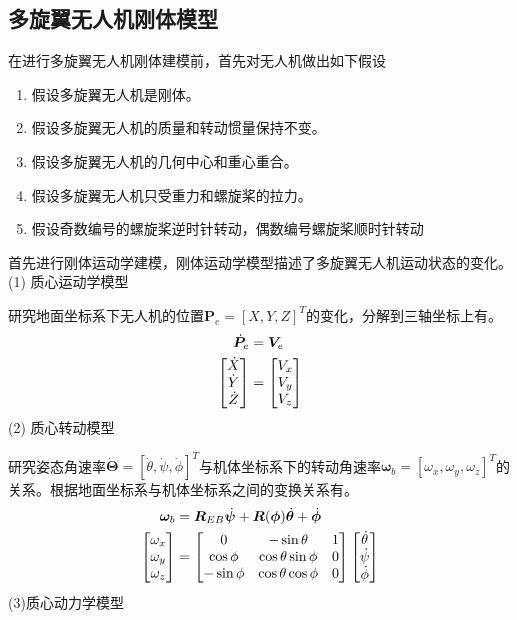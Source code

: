 \subsection{多旋翼无人机刚体模型}
在进行多旋翼无人机刚体建模前，首先对无人机做出如下假设
\begin{enumerate}  [itemindent=1em,label={(\arabic*)}]
\item 假设多旋翼无人机是刚体。
\item 假设多旋翼无人机的质量和转动惯量保持不变。
\item 假设多旋翼无人机的几何中心和重心重合。
\item 假设多旋翼无人机只受重力和螺旋桨的拉力。
\item 假设奇数编号的螺旋桨逆时针转动，偶数编号螺旋桨顺时针转动
\end{enumerate}
首先进行刚体运动学建模，刚体运动学模型描述了多旋翼无人机运动状态的变化。\\
(1) 质心运动学模型

研究地面坐标系下无人机的位置$\boldsymbol{P}_e = [X,Y,Z]^T$的变化，分解到三轴坐标上有。
\begin{equation}
\label{equ2.2}
\begin{aligned}
\dot{\boldsymbol{P}}_e &= \boldsymbol{V}_e \\
\begin{bmatrix}
\dot{X} \cr \dot{Y} \cr \dot{Z} \cr
\end{bmatrix}
&=
\begin{bmatrix}
V_x \cr V_y \cr V_z \cr
\end{bmatrix}
\end{aligned}
\end{equation}
(2) 质心转动模型

研究姿态角速率$\dot{\boldsymbol{\Theta}}=[\dot{\theta},\dot{\psi},\dot{\phi}]^T$与机体坐标系下的转动角速率$\boldsymbol{\omega}_b=[\omega_x , \omega_y , \omega_z]^T$的关系。根据地面坐标系与机体坐标系之间的变换关系有。
\begin{equation}
\label{equ2.3}
\begin{aligned}
\boldsymbol{\omega}_b & = \boldsymbol{R}_{EB} \dot{\boldsymbol{\psi}}+\boldsymbol{R}(\boldsymbol{\phi}) \dot{\boldsymbol{\theta}}+ \dot{\boldsymbol{\phi}} 
\\
\begin{bmatrix}
\omega_x \cr \omega_y \cr \omega_z \cr
\end{bmatrix}
& =
\begin{bmatrix}
0 & -\sin \theta & 1 \cr
\cos \phi & \cos \theta \sin \phi & 0 \cr
-\sin \phi & \cos \theta \cos \phi & 0 \cr
\end{bmatrix}
\begin{bmatrix}
\dot{\theta} \cr \dot{\psi}  \cr  \dot{\phi} \cr
\end{bmatrix}
\end{aligned}
\end{equation}
(3)质心动力学模型

